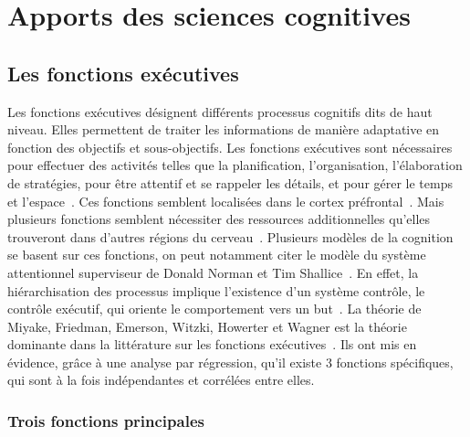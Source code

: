 \section{Apports des sciences cognitives}
    \subsection{Les fonctions exécutives}\label{sec:fx-exe}
        Les fonctions exécutives désignent différents processus cognitifs dits de haut niveau. Elles permettent de traiter les informations de manière adaptative en fonction des objectifs et sous-objectifs. Les fonctions exécutives sont nécessaires pour effectuer des activités telles que la planification, l'organisation, l'élaboration de stratégies, pour être attentif et se rappeler les détails, et pour gérer le temps et l'espace~. Ces fonctions semblent localisées dans le cortex préfrontal~. Mais plusieurs fonctions semblent nécessiter des ressources additionnelles qu'elles trouveront dans d'autres régions du cerveau~. Plusieurs modèles de la cognition se basent sur ces fonctions, on peut notamment citer le modèle du système attentionnel superviseur de Donald Norman et Tim Shallice~. En effet, la hiérarchisation des processus implique l'existence d'un système contrôle, le contrôle exécutif, qui oriente le comportement vers un but~. La théorie de Miyake, Friedman, Emerson, Witzki, Howerter et Wagner est la théorie dominante dans la littérature sur les fonctions exécutives~. Ils ont mis en évidence, grâce à une analyse par régression, qu'il existe 3 fonctions spécifiques, qui sont à la fois indépendantes et corrélées entre elles.
    \subsubsection{Trois fonctions principales}    
